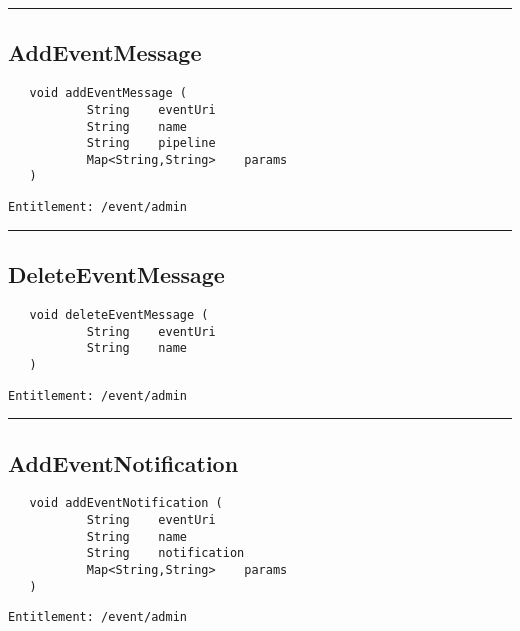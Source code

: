 \rule{12cm}{2pt}
\subsection{AddEventMessage}
\label{Api:AddEventMessage}
\begin{Verbatim}
   void addEventMessage (
           String    eventUri
           String    name
           String    pipeline
           Map<String,String>    params
   )
\end{Verbatim}
\begin{Verbatim}[formatcom=\color{Maroon}]
  Entitlement: /event/admin
\end{Verbatim}



\rule{12cm}{2pt}
\subsection{DeleteEventMessage}
\label{Api:DeleteEventMessage}
\begin{Verbatim}
   void deleteEventMessage (
           String    eventUri
           String    name
   )
\end{Verbatim}
\begin{Verbatim}[formatcom=\color{Maroon}]
  Entitlement: /event/admin
\end{Verbatim}



\rule{12cm}{2pt}
\subsection{AddEventNotification}
\label{Api:AddEventNotification}
\begin{Verbatim}
   void addEventNotification (
           String    eventUri
           String    name
           String    notification
           Map<String,String>    params
   )
\end{Verbatim}
\begin{Verbatim}[formatcom=\color{Maroon}]
  Entitlement: /event/admin
\end{Verbatim}



